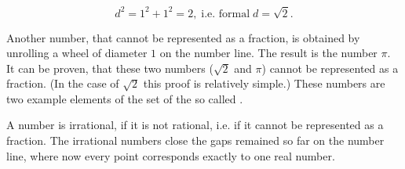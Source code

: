 \begin{MIntro}
\begin{minipage}{0.45\linewidth}
\begin{center}
\end{center}
\end{minipage}
\begin{minipage}{0.55\linewidth}
\begin{center}
$$d^2 = 1^2+1^2 = 2, \;\mbox{i.e.\ formal}\; d=\sqrt{2}.$$
\end{center}
\end{minipage}

\vspace*{5mm}

Another number, that cannot be represented as a fraction, is obtained by unrolling a wheel of diameter $1$ 
on the number line. The result is the number $\pi$. It can be proven, that these two numbers ($\sqrt{2}$ and $\pi$)
cannot be represented as a fraction. (In the case of $\sqrt{2}$ this proof is relatively simple.) These numbers are two 
example elements of the set of the so called .

\vspace*{5mm}

\begin{center}
\end{center}

A number is irrational, if it is not rational, i.e. if it cannot be represented as a fraction.
The irrational numbers close the gaps remained so far on the number line, where now every point 
corresponds exactly to one real number. 


\end{MIntro}
